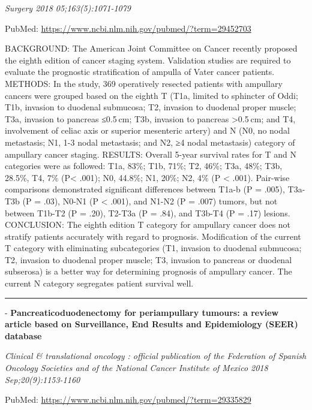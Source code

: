 \documentclass[]{article}
\begin{document}
\emph{Surgery 2018 05;163(5):1071-1079}

PubMed: \url{https://www.ncbi.nlm.nih.gov/pubmed/?term=29452703}

BACKGROUND: The American Joint Committee on Cancer recently proposed the
eighth edition of cancer staging system. Validation studies are required
to evaluate the prognostic stratification of ampulla of Vater cancer
patients. METHODS: In the study, 369 operatively resected patients with
ampullary cancers were grouped based on the eighth T (T1a, limited to
sphincter of Oddi; T1b, invasion to duodenal submucosa; T2, invasion to
duodenal proper muscle; T3a, invasion to pancreas ≤0.5 cm; T3b, invasion
to pancreas \textgreater{}0.5 cm; and T4, involvement of celiac axis or
superior mesenteric artery) and N (N0, no nodal metastasis; N1, 1-3
nodal metastasis; and N2, ≥4 nodal metastasis) category of ampullary
cancer staging. RESULTS: Overall 5-year survival rates for T and N
categories were as followed: T1a, 83\%; T1b, 71\%; T2, 46\%; T3a, 48\%;
T3b, 28.5\%, T4, 7\% (P\textless{} .001); N0, 44.8\%; N1, 20\%; N2, 4\%
(P \textless{} .001). Pair-wise comparisons demonstrated significant
differences between T1a-b (P = .005), T3a-T3b (P = .03), N0-N1 (P
\textless{} .001), and N1-N2 (P = .007) tumors, but not between T1b-T2
(P = .20), T2-T3a (P = .84), and T3b-T4 (P = .17) lesions. CONCLUSION:
The eighth edition T category for ampullary cancer does not stratify
patients accurately with regard to prognosis. Modification of the
current T category with eliminating subcategories (T1, invasion to
duodenal submucosa; T2, invasion to duodenal proper muscle; T3, invasion
to pancreas or duodenal subserosa) is a better way for determining
prognosis of ampullary cancer. The current N category segregates patient
survival well.

{}

{}

\begin{center}\rule{0.5\linewidth}{\linethickness}\end{center}

 - \textbf{Pancreaticoduodenectomy for periampullary tumours: a review
article based on Surveillance, End Results and Epidemiology (SEER)
database}

\emph{Clinical \& translational oncology : official publication of the
Federation of Spanish Oncology Societies and of the National Cancer
Institute of Mexico 2018 Sep;20(9):1153-1160}

PubMed: \url{https://www.ncbi.nlm.nih.gov/pubmed/?term=29335829}
\end{document}
